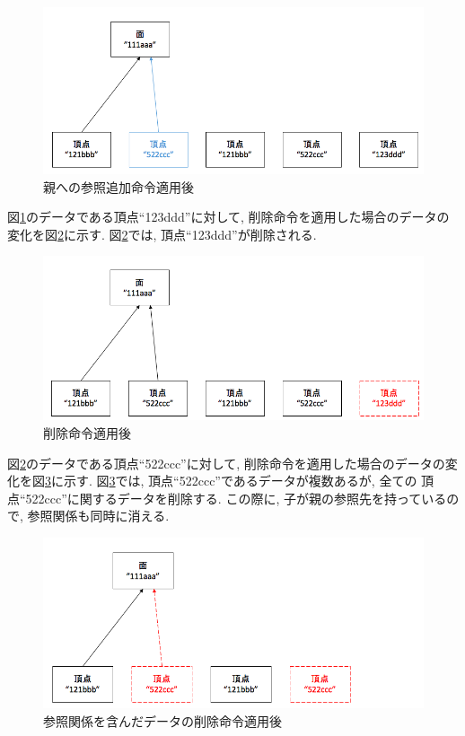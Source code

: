 \begin{figure}[htbp]
  \begin{center}
    \includegraphics[scale=0.45]{images/ope2}
    \caption{親への参照追加命令適用後}
    \label{命令2}
  \end{center}
\end{figure}
図\ref{命令2}のデータである頂点``123ddd''に対して, 削除命令を適用した場合のデータの変化を図\ref{命令3}に示す. 図\ref{命令3}では, 頂点``123ddd''が削除される.
\begin{figure}[htbp]
  \begin{center}
    \includegraphics[scale=0.45]{images/ope3}
    \caption{削除命令適用後}
    \label{命令3}
  \end{center}
\end{figure}
図\ref{命令3}のデータである頂点``522ccc''に対して, 削除命令を適用した場合のデータの変化を図\ref{命令4}に示す. 図\ref{命令4}では, 頂点``522ccc''であるデータが複数あるが, 全ての 頂点``522ccc''に関するデータを削除する. この際に, 子が親の参照先を持っているので, 参照関係も同時に消える.
\begin{figure}[htbp]
  \begin{center}
    \includegraphics[scale=0.45]{images/ope4}
    \caption{参照関係を含んだデータの削除命令適用後}
    \label{命令4}
  \end{center}
\end{figure}
